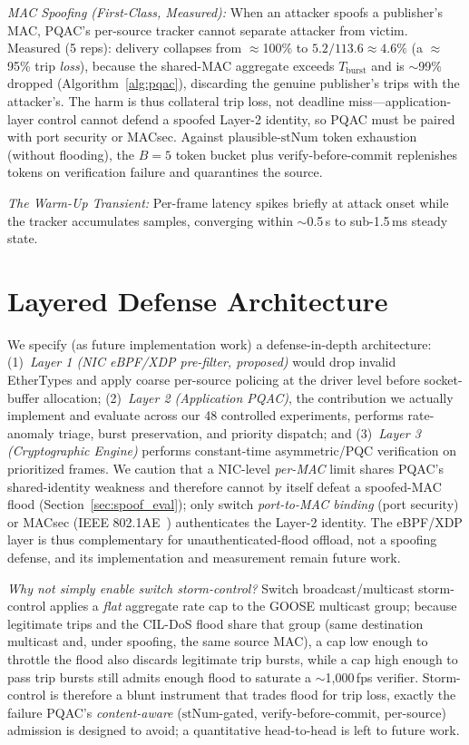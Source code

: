 \documentclass[journal]{IEEEtran}
\begin{document}
\textit{MAC Spoofing (First-Class, Measured):} When an attacker spoofs a publisher's MAC, PQAC's per-source tracker cannot separate attacker from victim. Measured (5 reps): delivery collapses from $\approx$100\% to $5.2/113.6\approx 4.6\%$ (a $\approx$95\% trip \emph{loss}), because the shared-MAC aggregate exceeds $T_{\text{burst}}$ and is $\sim$99\% dropped (Algorithm~\ref{alg:pqac}), discarding the genuine publisher's trips with the attacker's. The harm is thus collateral trip loss, not deadline miss---application-layer control cannot defend a spoofed Layer-2 identity, so PQAC must be paired with port security or MACsec. Against plausible-$\text{stNum}$ token exhaustion (without flooding), the $B=5$ token bucket plus verify-before-commit replenishes tokens on verification failure and quarantines the source.

\textit{The Warm-Up Transient:} Per-frame latency spikes briefly at attack onset while the tracker accumulates samples, converging within $\sim$0.5\,s to sub-1.5\,ms steady state.

\section{Layered Defense Architecture}
\label{sec:defense}
We specify (as future implementation work) a defense-in-depth architecture: (1)~\emph{Layer 1 (NIC eBPF/XDP pre-filter, proposed)} would drop invalid EtherTypes and apply coarse per-source policing at the driver level before socket-buffer allocation; (2)~\emph{Layer 2 (Application PQAC)}, the contribution we actually implement and evaluate across our 48 controlled experiments, performs rate-anomaly triage, burst preservation, and priority dispatch; and (3)~\emph{Layer 3 (Cryptographic Engine)} performs constant-time asymmetric/PQC verification on prioritized frames. We caution that a NIC-level \emph{per-MAC} limit shares PQAC's shared-identity weakness and therefore cannot by itself defeat a spoofed-MAC flood (Section~\ref{sec:spoof_eval}); only switch \emph{port-to-MAC binding} (port security) or MACsec (IEEE 802.1AE~\cite{ieee8021ae}) authenticates the Layer-2 identity. The eBPF/XDP layer is thus complementary for unauthenticated-flood offload, not a spoofing defense, and its implementation and measurement remain future work.

\emph{Why not simply enable switch storm-control?} Switch broadcast/multicast storm-control applies a \emph{flat} aggregate rate cap to the GOOSE multicast group; because legitimate trips and the CIL-DoS flood share that group (same destination multicast and, under spoofing, the same source MAC), a cap low enough to throttle the flood also discards legitimate trip bursts, while a cap high enough to pass trip bursts still admits enough flood to saturate a $\sim$1{,}000\,fps verifier. Storm-control is therefore a blunt instrument that trades flood for trip loss, exactly the failure PQAC's \emph{content-aware} ($\text{stNum}$-gated, verify-before-commit, per-source) admission is designed to avoid; a quantitative head-to-head is left to future work.
\end{document}
